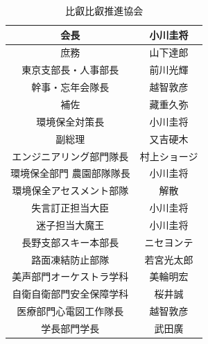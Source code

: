 \documentclass[12pt]{jsarticle}
\begin{document}
\begin{table}[htb]
\begin{center}
\begin{tabular}{|c|c|} 
\hline
	会長 & 小川圭将\tabularnewline  \hline
庶務 & 山下達郎\tabularnewline  \hline
東京支部長・人事部長 & 前川光輝\tabularnewline  \hline
幹事・忘年会隊長 & 越智敦彦\tabularnewline  \hline
補佐 & 藏重久弥\tabularnewline  \hline
環境保全対策長 & 小川圭将\tabularnewline  \hline
副総理 & 又吉硬木\tabularnewline  \hline
エンジニアリング部門隊長 & 村上ショージ\tabularnewline  \hline
環境保全部門 農園部隊隊長 & 小川圭将\tabularnewline  \hline
環境保全アセスメント部隊 & 解散\tabularnewline  \hline
失言訂正担当大臣 & 小川圭将\tabularnewline  \hline
迷子担当大魔王 & 小川圭将\tabularnewline  \hline
長野支部スキー本部長 & ニセヨンテ\tabularnewline  \hline
路面凍結防止部隊 & 若宮光太郎\tabularnewline  \hline
美声部門オーケストラ学科 & 美輪明宏\tabularnewline  \hline
自衛自衛部門安全保障学科 & 桜井誠\tabularnewline  \hline
医療部門心電図工作隊長 & 越智敦彦\tabularnewline  \hline
学長部門学長 &武田廣\tabularnewline 
	\hline
	\end{tabular}
	\end{center}
	\caption{比叡比叡推進協会}  
	\label{gas1}
\end{table}

\newpage
\end{document}
